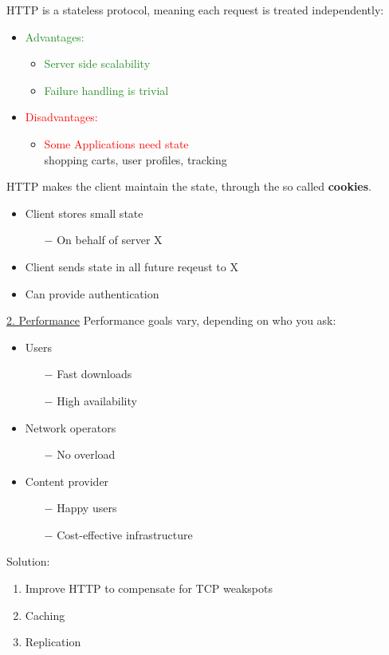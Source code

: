 \documentclass[a4paper, fontsize=8pt, landscape, DIV=1]{scrartcl}
\begin{document}
\begin{multicols*}{4}
		HTTP is a stateless protocol, meaning each request is treated independently:
		\begin{itemize}[noitemsep]
			\item \textcolor{ForestGreen}{Advantages:}
			\begin{itemize}
				\item \textcolor{ForestGreen}{Server side scalability}
				\item \textcolor{ForestGreen}{Failure handling is trivial}
			\end{itemize}
			\item \textcolor{red}{Disadvantages:}
			\begin{itemize}
				\item \textcolor{red}{Some Applications need state} \\
				shopping carts, user profiles, tracking
			\end{itemize} 
		\end{itemize}
		HTTP makes the client maintain the state, through the so called
		\textbf{cookies}.
		\begin{itemize}[noitemsep]
			\item Client stores small state
			\begin{itemize}
				\item[$-$] On behalf of server X
			\end{itemize}
			\item Client sends state in all future reqeust to X
			\item Can provide authentication
		\end{itemize}
		\par 
		
		\underline{2. Performance}
		Performance goals vary, depending on who you ask: 
		\begin{itemize}[noitemsep]
			\item Users
			\begin{itemize}
				\item[$-$] Fast downloads
				\item[$-$] High availability
			\end{itemize}
			\item Network operators
			\begin{itemize}
				\item[$-$] No overload
			\end{itemize}
			\item Content provider
			\begin{itemize}
				\item[$-$] Happy users
				\item[$-$] Cost-effective infrastructure 
			\end{itemize}
		\end{itemize}
		Solution:
		\begin{enumerate}[label=(\roman*),noitemsep]
			\item Improve HTTP to compensate for TCP weakspots
			\item Caching 
			\item Replication
		\end{enumerate}
		\par 
		

\end{multicols*}
\end{document}
